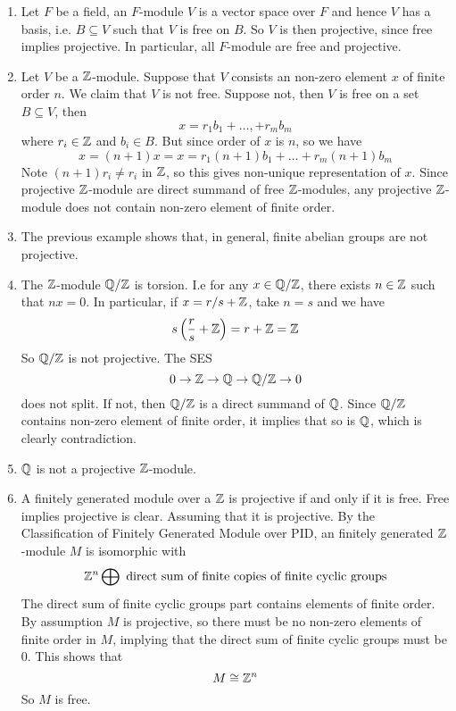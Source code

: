 \begin{ex}
    \hfill

    \begin{enumerate}
        \item Let $F$ be a field, an $F$-module $V$ is a vector space over $F$ and hence $V$ has a basis, i.e. $B\subseteq V$ such that $V$ is free on $B$. So $V$ is then projective, since free implies projective. In particular, all $F$-module are free and projective.
        \item Let $V$ be a ${\mathbb Z}$-module. Suppose that $V$ consists an non-zero element $x$ of finite order $n$. We claim that $V$ is not free. Suppose not, then $V$ is free on a set $B\subseteq V$, then 
        \[x = r_1 b_1 + \dots, + r_mb_m\]
        where $r_i\in {\mathbb Z}$ and $b_i\in B$. But since order of $x$ is $n$, so we have
        \[x = (n+1)x = x = r_1(n+1)b_1 + \dots + r_m(n+1)b_m\]
        Note $(n+1)r_i \neq r_i$ in ${\mathbb Z}$, so this gives non-unique representation of $x$. Since projective ${\mathbb Z}$-module are direct summand of free ${\mathbb Z}$-modules, any projective ${\mathbb Z}$-module does not contain non-zero element of finite order.
        \item The previous example shows that, in general, finite abelian groups are not projective.
        \item The ${\mathbb Z}$-module ${\mathbb Q}/{\mathbb Z}$ is torsion. I.e for any $x\in {\mathbb Q}/{\mathbb Z}$, there exists $n\in {\mathbb Z}$ such that $nx=0$. In particular, if $x = r/s + {\mathbb Z}$, take $n=s$ and we have
        \[s\left(\frac{r}{s} + {\mathbb Z}\right) = r + {\mathbb Z} = {\mathbb Z}\]
        So ${\mathbb Q}/{\mathbb Z}$ is not projective. The SES
        \[0 \to {\mathbb Z}\to {\mathbb Q} \to {\mathbb Q}/{\mathbb Z} \to 0\]
        does not split. If not, then ${\mathbb Q}/{\mathbb Z}$ is a direct summand of ${\mathbb Q}$. Since ${\mathbb Q}/{\mathbb Z}$ contains non-zero element of finite order, it implies that so is ${\mathbb Q}$, which is clearly contradiction.
        \item ${\mathbb Q}$ is not a projective ${\mathbb Z}$-module.
        \item A finitely generated module over a ${\mathbb Z}$ is projective if and only if it is free. Free implies projective is clear. Assuming that it is projective. By the Classification of Finitely Generated Module over PID, an finitely generated ${\mathbb Z}$-module $M$ is isomorphic with 
        \[{\mathbb Z}^n \bigoplus \text{ direct sum of finite copies of finite cyclic groups}\]
        The direct sum of finite cyclic groups part contains elements of finite order. By assumption $M$ is projective, so there must be no non-zero elements of finite order in $M$, implying that the direct sum of finite cyclic groups must be $0$. This shows that 
        \[M \cong {\mathbb Z}^n\]
        So $M$ is free.
    \end{enumerate}
\end{ex}

